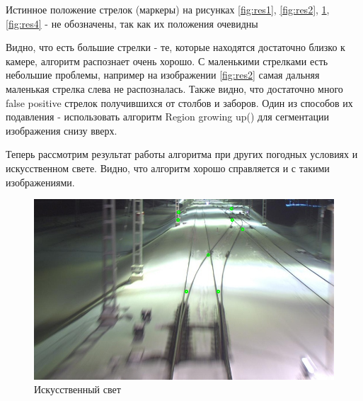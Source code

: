 Истинное положение стрелок (маркеры) на рисунках \ref{fig:res1}, \ref{fig:res2}, \ref{fig:res3}, \ref{fig:res4} - не обозначены, так как их положения очевидны

Видно, что есть большие стрелки - те, которые находятся достаточно близко к камере, алгоритм распознает очень хорошо. С маленькими стрелками есть небольшие проблемы, например на изображении \ref{fig:res2} самая дальняя маленькая стрелка слева не распозналась.\newline
Также видно, что достаточно много false positive стрелок получившихся от столбов и заборов. Один из способов их подавления - использовать алгоритм Region growing up(\cite{b:growing_up}) для сегментации изображения снизу вверх.

Теперь рассмотрим результат работы алгоритма при других погодных условиях и искусственном свете. Видно, что алгоритм хорошо справляется и с такими изображениями.
\begin{figure}[!h]
	\centering
	\includegraphics[width=0.7\linewidth]{pictures/screenshot0017}
	\caption{Искусственный свет}
	\label{fig:res3}
\end{figure}

